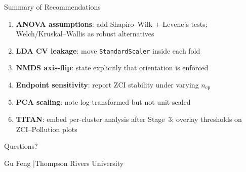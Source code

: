 \documentclass[aspectratio=169, 11pt]{beamer}
\newcommand{\hl}[1]{\textcolor{TRUblue}{\textbf{#1}}}
\newcommand{\code}[1]{\texttt{\small #1}}
\begin{document}
\begin{frame}{Summary of Recommendations}
  \begin{enumerate}
    \item \hl{ANOVA assumptions}: add Shapiro--Wilk + Levene's tests;
          Welch/Kruskal--Wallis as robust alternatives
    \item \hl{LDA CV leakage}: move \code{StandardScaler} inside each fold
    \item \hl{NMDS axis-flip}: state explicitly that orientation is enforced
    \item \hl{Endpoint sensitivity}: report ZCI stability under varying $n_{\text{ep}}$
    \item \hl{PCA scaling}: note log-transformed but not unit-scaled
    \item \hl{TITAN}: embed per-cluster analysis after Stage~3;
          overlay thresholds on ZCI--Pollution plots
  \end{enumerate}
\end{frame}

\begin{frame}{}
  \centering
  \vspace{2cm}
  {\Huge\color{TRUblue} Questions?}

  \vspace{1.5cm}
  {\large Gu Feng \quad|\quad Thompson Rivers University}
\end{frame}
\end{document}
